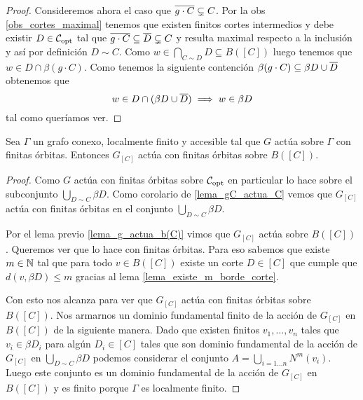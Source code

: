 \documentclass[tesis.tex]{subfiles}
\begin{document}
\begin{proof}
	Consideremos ahora el caso que ${\overline{ g \cdot C}} \subsetneq C$.
	Por la obs \ref{obs_cortes_maximal} tenemos que existen finitos cortes intermedios y debe existir $D \in {\cal C}_{\text{opt}}$ tal que 
	$\overline{g \cdot C}  \subseteq \overline D \subsetneq C$ y resulta maximal respecto a la inclusión y así por definición $D \sim C$.
	Como $w \in \bigcap_{C \sim D} D  \subseteq B([C])$ luego tenemos que 
	$w \in D \cap \beta (g \cdot C)$.
	Como tenemos la siguiente contención $\beta (g \cdot C) \subseteq \beta D \cup \overline D$ obtenemos que
	\[
	w \in D \cap (\beta D \cup \overline D) \implies w \in \beta D
	\]
	tal como queríamos ver.
\end{proof}


\begin{lema}\label{lema_accion_b(C)}
	Sea $\Gamma$ un grafo conexo, localmente finito y accesible tal que $G$ actúa sobre $\Gamma$ con finitas órbitas.
	Entonces $G_{[C]}$ actúa con finitas órbitas sobre $B([C])$.
\end{lema}
\begin{proof}
	Como $G$ actúa con finitas órbitas sobre ${\cal C}_{\text{opt}}$ en particular lo hace sobre el subconjunto $\bigcup_{D \sim C} \beta D$.
	Como corolario de \ref{lema_gC_actua_C} vemos que $G_{[C]}$ actúa con finitas órbitas en el conjunto $ \bigcup_{D \sim C} \beta D $.
	
	Por el lema previo \ref{lema_g_actua_b(C)} vimos que $G_{[C]}$ actúa sobre $B([C])$.
	Queremos ver que lo hace con finitas órbitas.
	Para eso sabemos que existe $m \in \mathbb{N}$ tal que para todo $v \in B([C])$ existe un corte $D \in [C]$ que cumple que
	$d(v,\beta D) \le m$ gracias al lema \ref{lema_existe_m_borde_corte}.
	
	Con esto nos alcanza para ver que $G_{[C]}$ actúa con finitas órbitas sobre $B([C])$.
	Nos armarnos un dominio fundamental finito de la acción de $G_{[C]}$ en $B([C])$ de la siguiente manera.
	Dado que existen finitos $v_{1}, \dots, v_{n}$ tales que $v_{i} \in \beta D_{i}$ para algún $D_{i} \in [C]$ tales que son dominio fundamental de la acción de $G_{[C]}$ en $\bigcup_{D \sim C} \beta D$ podemos considerar el conjunto 
	$A  = \bigcup_{i=1 \dots n} N^m(v_{i})$. 
	Luego este conjunto es un dominio fundamental de la acción de $G_{[C]}$ en $B([C])$ y es finito porque $\Gamma$ es localmente finito.
\end{proof}
\end{document}
